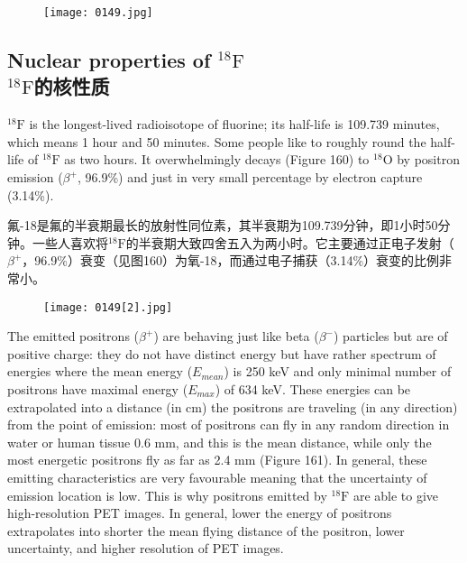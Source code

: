 \documentclass[dvipsnames, svgnames,a4paper,11pt]{article}
\begin{document}
\begin{figure}[h]
	\centering
    \texttt{[image: 0149.jpg]}    
     \label{fig159}
\end{figure}


\subsection{Nuclear properties of ${}^\mathrm{18}\mathrm{F}$ \\${}^\mathrm{18}\mathrm{F}$的核性质}

${}^\mathrm{18}\mathrm{F}$ is the longest-lived radioisotope of fluorine; its half-life is 109.739 minutes, which
means 1 hour and 50 minutes. Some people like to roughly round the half-life of ${}^\mathrm{18}\mathrm{F}$
as two hours. It overwhelmingly decays (Figure 160) to ${}^\mathrm{18}\mathrm{O}$ by positron emission ($\beta^{+}$,
96.9\%) and just in very small percentage by electron capture (3.14\%).

氟-18是氟的半衰期最长的放射性同位素，其半衰期为109.739分钟，即1小时50分钟。一些人喜欢将${}^\mathrm{18}\mathrm{F}$的半衰期大致四舍五入为两小时。它主要通过正电子发射（$\beta^{+}$，96.9\%）衰变（见图160）为氧-18，而通过电子捕获（3.14\%）衰变的比例非常小。

\begin{figure}[h]
	\centering
    \texttt{[image: 0149[2].jpg]}    
     \label{fig160}
\end{figure}


The emitted positrons ($\beta^{+}$) are behaving just like beta ($\beta^{-}$) particles but are of positive
charge: they do not have distinct energy but have rather spectrum of energies where
the mean energy ($E_{mean}$) is 250 keV and only minimal number of positrons have
maximal energy ($E_{max}$) of 634 keV. These energies can be extrapolated into a
distance (in cm) the positrons are traveling (in any direction) from the point of
emission: most of positrons can fly in any random direction in water or human tissue
0.6 mm, and this is the mean distance, while only the most energetic positrons fly as
far as 2.4 mm (Figure 161). In general, these emitting characteristics are very
favourable meaning that the uncertainty of emission location is low. This is why
positrons emitted by ${}^\mathrm{18}\mathrm{F}$ are able to give high-resolution PET images. In general,
lower the energy of positrons extrapolates into shorter the mean flying distance of
the positron, lower uncertainty, and higher resolution of PET images.
\end{document}
